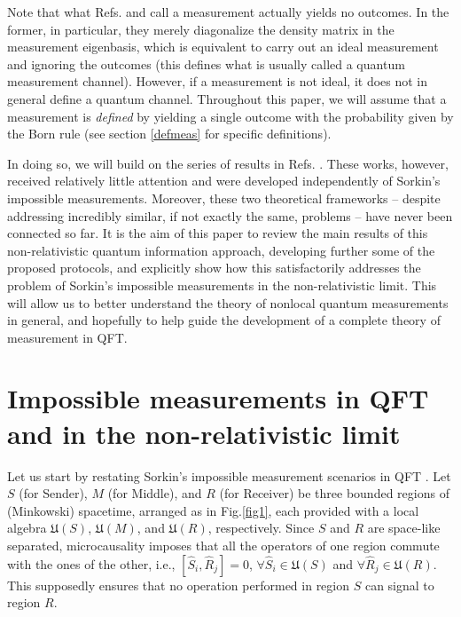 \documentclass[a4paper,twocolumn,11pt,accepted=2024-02-14]{quantumarticle}
\begin{document}
Note that what Refs. \cite{beckman2001causal} and \cite{fewster2020quantum} call a measurement actually yields no outcomes. In the former, in particular, they merely diagonalize the density matrix in the measurement eigenbasis, which is equivalent to carry out an ideal measurement and ignoring the outcomes (this defines what is usually called a quantum measurement channel). However, if a measurement is not ideal, it does not in general define a quantum channel. Throughout this paper, we will assume that a measurement is \textit{defined} by yielding a single outcome with the probability given by the Born rule (see section \ref{defmeas} for specific definitions).

In doing so, we will build on the series of results in Refs. \cite{aharonov1986measurement, popescu1994causality, groisman2001nonlocal, groisman2002measurements, vaidman2003instantaneous}. These works,  however, received relatively little attention and were developed independently of Sorkin's impossible measurements. Moreover, these two theoretical frameworks -- despite addressing incredibly similar, if not exactly the same, problems -- have never been connected so far.
It is the aim of this paper to review the main results of this non-relativistic quantum information approach, developing further some of the proposed protocols, and  explicitly show how this satisfactorily addresses the problem of Sorkin's impossible measurements in the non-relativistic limit. This will allow us to better understand the theory of nonlocal quantum measurements in general, and hopefully to help guide the development of a complete theory of measurement in QFT. 







\section{Impossible measurements in QFT and in the non-relativistic limit}
\label{imp}



Let us start by restating Sorkin's impossible measurement scenarios in QFT \cite{sorkin1993impossible}. Let $S$ (for Sender), $M$ (for Middle), and $R$ (for Receiver) be three bounded regions of (Minkowski)  spacetime, arranged as in Fig.\ref{fig1}, each provided with a local algebra     $\mathfrak{U}(S)$,     $\mathfrak{U}(M)$, and     $\mathfrak{U}(R)$, respectively. Since $S$ and $R$ are space-like separated, microcausality imposes that all the operators of one region commute with the ones of the other, i.e., $[\hat S_i,\hat R_j]=0$, $\forall \hat S_i\in \mathfrak{U}(S)$ and $\forall \hat R_j \in \mathfrak{U}(R)$. This supposedly ensures that no operation performed in region $S$ can signal to region $R$. 
\end{document}
